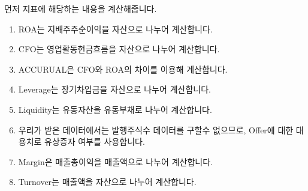 \documentclass[12pt,]{book}
\newenvironment{Shaded}{\begin{snugshade}}{\end{snugshade}}
\newcommand{\CommentTok}[1]{\textcolor[rgb]{0.56,0.35,0.01}{\textit{#1}}}
\newcommand{\NormalTok}[1]{#1}
\newcommand{\OperatorTok}[1]{\textcolor[rgb]{0.81,0.36,0.00}{\textbf{#1}}}
\newcommand{\StringTok}[1]{\textcolor[rgb]{0.31,0.60,0.02}{#1}}
\providecommand{\tightlist}{%
  \setlength{\itemsep}{0pt}\setlength{\parskip}{0pt}}
\begin{document}
\begin{Shaded}
\end{Shaded}

먼저 지표에 해당하는 내용을 계산해줍니다.

\begin{enumerate}
\def\labelenumi{\arabic{enumi}.}
\tightlist
\item
  ROA는 지배주주순이익을 자산으로 나누어 계산합니다.
\item
  CFO는 영업활동현금흐름을 자산으로 나누어 계산합니다.
\item
  ACCURUAL은 CFO와 ROA의 차이를 이용해 계산합니다.
\item
  Leverage는 장기차입금을 자산으로 나누어 계산합니다.
\item
  Liquidity는 유동자산을 유동부채로 나누어 계산합니다.
\item
  우리가 받은 데이터에서는 발행주식수 데이터를 구할수 없으므로, Offer에 대한 대용치로 유상증자 여부를 사용합니다.
\item
  Margin은 매출총이익을 매출액으로 나누어 계산합니다.
\item
  Turnover는 매출액을 자산으로 나누어 계산합니다.
\end{enumerate}
\end{document}
